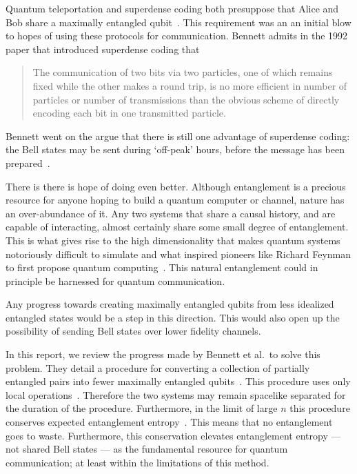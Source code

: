 Quantum teleportation and superdense coding both presuppose that Alice and Bob share a maximally entangled qubit~\cite{barrett2004teleportation, bennett1992superdense}. 
This requirement was an an initial blow to hopes of using these protocols for communication.
Bennett admits in the 1992 paper that introduced superdense coding that

\hyphenblockcquote{UKenglish}{bennett1992superdense}{
The communication of two bits via two particles, one of which remains fixed while the other makes a round trip, is no more efficient in number of particles or number of transmissions than the obvious scheme of directly encoding each bit in one transmitted particle.
}

Bennett went on the argue that there is still one advantage of superdense coding: the Bell states may be sent during `off-peak' hours, before the message has been prepared~\cite{bennett1992superdense}.

There is there is hope of doing even better.
Although entanglement is a precious resource for anyone hoping to build a quantum computer or channel, nature has an over-abundance of it. 
Any two systems that share a causal history, and are capable of interacting, almost certainly share some small degree of entanglement.
This is what gives rise to the high dimensionality that makes quantum systems notoriously difficult to simulate and what inspired pioneers like Richard Feynman to first propose quantum computing~\cite{feynman1982simulating}.
This natural entanglement could in principle be harnessed for quantum communication.

Any progress towards creating maximally entangled qubits from less idealized entangled states would be a step in this direction.
This would also open up the possibility of sending Bell states over lower fidelity channels.

In this report, we review the progress made by Bennett et al.\ to solve this problem.
They detail a procedure for converting a collection of partially entangled pairs into fewer maximally entangled qubits~\cite{bennett1996concentrating}.
This procedure uses only local operations~\cite{bennett1996concentrating}.
Therefore the two systems may remain spacelike separated for the duration of the procedure.
Furthermore, in the limit of large $n$ this procedure conserves expected entanglement entropy~\cite{bennett1996concentrating}.
This means that no entanglement goes to waste.
Furthermore, this conservation elevates entanglement entropy --- not shared Bell states --- as the fundamental resource for quantum communication; at least within the limitations of this method.

